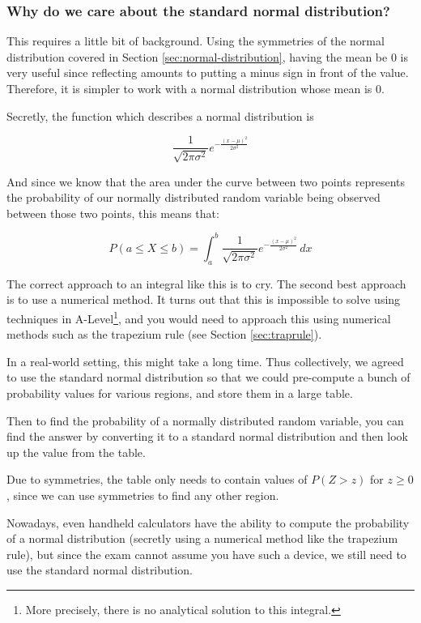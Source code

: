 \subsubsection{Why do we care about the standard normal distribution?}

This requires a little bit of background. Using the symmetries of the normal distribution covered in Section \ref{sec:normal-distribution}, having the mean be $0$ is very useful since reflecting amounts to putting a minus sign in front of the value.
Therefore, it is simpler to work with a normal distribution whose mean is $0$. 

Secretly, the function which describes a normal distribution is

\[ \frac{1}{\sqrt{2 \pi \sigma^2}} e^{-\frac{(x-\mu)^2}{2\sigma^2}} \]

And since we know that the area under the curve between two points represents the probability of our normally distributed random variable being observed between those two points, this means that:

\[ P(a \leq X \leq b) = \int_a^b \frac{1}{\sqrt{2 \pi \sigma^2}} e^{-\frac{(x-\mu)^2}{2\sigma^2}} \, dx \]

The correct approach to an integral like this is to cry. The second best approach is to use a numerical method. It turns out that this is impossible to solve using techniques in A-Level\footnote{More precisely, there is no analytical solution to this integral.}, 
and you would need to approach this using numerical methods such as the trapezium rule (see Section \ref{sec:traprule}).

In a real-world setting, this might take a long time. Thus collectively, we agreed to use the standard normal distribution so that we could pre-compute a bunch of probability values for various regions, and store them in a large table.

Then to find the probability of a normally distributed random variable, you can find the answer by converting it to a standard normal distribution and then look up the value from the table.

Due to symmetries, the table only needs to contain values of $P(Z>z)$ for $z\geq 0$, since we can use symmetries to find any other region.

Nowadays, even handheld calculators have the ability to compute the probability of a normal distribution (secretly using a numerical method like the trapezium rule), but since the exam cannot assume you have such a device, we still need to use the standard normal distribution.

